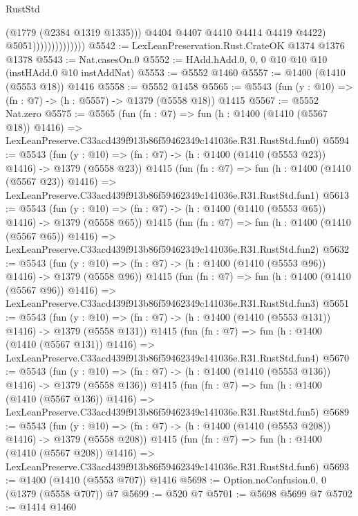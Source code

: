 \begin{lexlean}{RustStd}
\begin{coremodule}
                                    (@1779 (@2384 @1319 @1335)))
                                  @4404
                                  @4407
                                  @4410
                                  @4414
                                  @4419
                                  @4422)
                                @5051))))))))))))))
@5542 := LexLeanPreservation.Rust.CrateOK @1374 @1376 @1378
@5543 := Nat.casesOn.{0}
@5552 := HAdd.hAdd.{0, 0, 0} @10 @10 @10 (instHAdd.{0} @10 instAddNat)
@5553 := @5552 @1460
@5557 := @1400 (@1410 (@5553 @18)) @1416
@5558 := @5552 @1458
@5565 := @5543 (fun (y : @10) => (fn : @7) -> (h : @5557) -> @1379 (@5558 @18)) @1415
@5567 := @5552 Nat.zero
@5575 := @5565
    (fun (fn : @7) =>
    fun (h : @1400 (@1410 (@5567 @18)) @1416) =>
    LexLeanPreserve.C33acd439f913b86f59462349c141036e.R31.RustStd.fun0)
@5594 := @5543
    (fun (y : @10) => (fn : @7) -> (h : @1400 (@1410 (@5553 @23)) @1416) -> @1379 (@5558 @23))
    @1415
    (fun (fn : @7) =>
    fun (h : @1400 (@1410 (@5567 @23)) @1416) =>
    LexLeanPreserve.C33acd439f913b86f59462349c141036e.R31.RustStd.fun1)
@5613 := @5543
    (fun (y : @10) => (fn : @7) -> (h : @1400 (@1410 (@5553 @65)) @1416) -> @1379 (@5558 @65))
    @1415
    (fun (fn : @7) =>
    fun (h : @1400 (@1410 (@5567 @65)) @1416) =>
    LexLeanPreserve.C33acd439f913b86f59462349c141036e.R31.RustStd.fun2)
@5632 := @5543
    (fun (y : @10) => (fn : @7) -> (h : @1400 (@1410 (@5553 @96)) @1416) -> @1379 (@5558 @96))
    @1415
    (fun (fn : @7) =>
    fun (h : @1400 (@1410 (@5567 @96)) @1416) =>
    LexLeanPreserve.C33acd439f913b86f59462349c141036e.R31.RustStd.fun3)
@5651 := @5543
    (fun (y : @10) => (fn : @7) -> (h : @1400 (@1410 (@5553 @131)) @1416) -> @1379 (@5558 @131))
    @1415
    (fun (fn : @7) =>
    fun (h : @1400 (@1410 (@5567 @131)) @1416) =>
    LexLeanPreserve.C33acd439f913b86f59462349c141036e.R31.RustStd.fun4)
@5670 := @5543
    (fun (y : @10) => (fn : @7) -> (h : @1400 (@1410 (@5553 @136)) @1416) -> @1379 (@5558 @136))
    @1415
    (fun (fn : @7) =>
    fun (h : @1400 (@1410 (@5567 @136)) @1416) =>
    LexLeanPreserve.C33acd439f913b86f59462349c141036e.R31.RustStd.fun5)
@5689 := @5543
    (fun (y : @10) => (fn : @7) -> (h : @1400 (@1410 (@5553 @208)) @1416) -> @1379 (@5558 @208))
    @1415
    (fun (fn : @7) =>
    fun (h : @1400 (@1410 (@5567 @208)) @1416) =>
    LexLeanPreserve.C33acd439f913b86f59462349c141036e.R31.RustStd.fun6)
@5693 := @1400 (@1410 (@5553 @707)) @1416
@5698 := Option.noConfusion.{0, 0} (@1379 (@5558 @707)) @7
@5699 := @520 @7
@5701 := @5698 @5699 @7
@5702 := @1414 @1460

\end{coremodule}
\end{lexlean}
